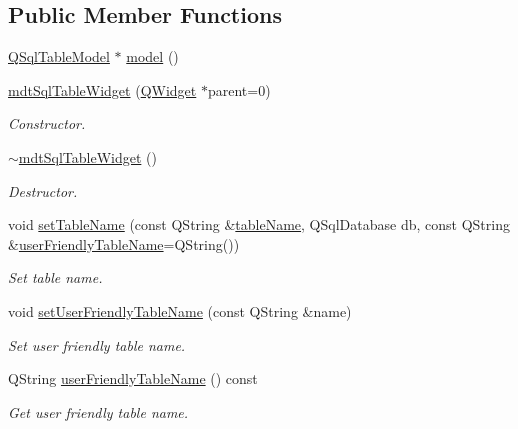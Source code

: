 \subsection*{Public Member Functions}
\begin{DoxyCompactItemize}
\item 
\hyperlink{class_q_sql_table_model}{Q\-Sql\-Table\-Model} $\ast$ \hyperlink{classmdt_sql_table_widget_a188d79ad6acb3e3a7984e1bbeee09798}{model} ()
\item 
\hyperlink{classmdt_sql_table_widget_a4cf2b0d69608e88d33996148f612e58d}{mdt\-Sql\-Table\-Widget} (\hyperlink{class_q_widget}{Q\-Widget} $\ast$parent=0)
\begin{DoxyCompactList}\small\item\em Constructor. \end{DoxyCompactList}\item 
\hyperlink{classmdt_sql_table_widget_ab5db8a20c64340bba4841a1b1c928d7f}{$\sim$mdt\-Sql\-Table\-Widget} ()
\begin{DoxyCompactList}\small\item\em Destructor. \end{DoxyCompactList}\item 
void \hyperlink{classmdt_sql_table_widget_a36eb282b41ced6d07ffd550594101b23}{set\-Table\-Name} (const Q\-String \&\hyperlink{classmdt_sql_table_widget_a5ebff43d17810531de12c7c3eb208a85}{table\-Name}, Q\-Sql\-Database db, const Q\-String \&\hyperlink{classmdt_sql_table_widget_a3ed02d8946711f9f0f16b55285467839}{user\-Friendly\-Table\-Name}=Q\-String())
\begin{DoxyCompactList}\small\item\em Set table name. \end{DoxyCompactList}\item 
void \hyperlink{classmdt_sql_table_widget_aa4756dd0ac75f70327077696184960cd}{set\-User\-Friendly\-Table\-Name} (const Q\-String \&name)
\begin{DoxyCompactList}\small\item\em Set user friendly table name. \end{DoxyCompactList}\item 
Q\-String \hyperlink{classmdt_sql_table_widget_a3ed02d8946711f9f0f16b55285467839}{user\-Friendly\-Table\-Name} () const 
\begin{DoxyCompactList}\small\item\em Get user friendly table name. \end{DoxyCompactList}\item 

\end{DoxyCompactItemize}
